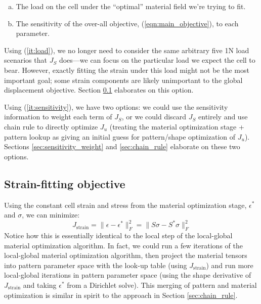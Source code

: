 \documentclass[10pt]{article}
\providecommand{\norm}[1]{\lVert#1\rVert}
\begin{document}
\begin{enumerate}[(a)]
    \item The load on the cell under the ``optimal'' material field we're trying to fit.
          \label{it:load}
    \item The sensitivity of the over-all objective, (\ref{eqn:main_objective}),
          to each parameter.
          \label{it:sensitivity}
\end{enumerate}

Using (\ref{it:load}), we no longer need to consider the same arbitrary five 1N
load scenarios that $J_S$ does---we can focus on the particular load we expect
the cell to bear. However, exactly fitting the strain under this load might not
be the most important goal; some strain components are likely unimportant to
the global displacement objective. Section \ref{sec:strain_fit} elaborates on this option.

Using (\ref{it:sensitivity}), we have two options: we could use the sensitivity
information to weight each term of $J_S$, or we could discard $J_S$ entirely
and use chain rule to directly optimize $J_u$ (treating
the material optimization stage + pattern lookup as giving an initial guess for
pattern/shape optimization of $J_u$). Sections \ref{sec:sensitivity_weight}
and \ref{sec:chain_rule} elaborate on these two options.

\subsection{Strain-fitting objective}
\label{sec:strain_fit}
Using the constant cell strain and stress from the material optimization stage,
$\epsilon^*$ and $\sigma$, we can minimize:
$$
J_\text{strain} = \norm{\epsilon - \epsilon^*}^2_F = \norm{S \sigma - S^* \sigma}_F^2
$$
Notice how this is essentially identical to the local step of the local-global
material optimization algorithm. In fact, we could run a few iterations of the
local-global material optimization algorithm, then project the material tensors into
pattern parameter space with the look-up table (using $J_\text{strain}$) and
run more local-global iterations in pattern parameter space  (using the shape
derivative of $J_\text{strain}$ and taking $\epsilon^*$ from a Dirichlet
solve). This merging of pattern and material optimization is similar in spirit to
the approach in Section \ref{sec:chain_rule}.
\end{document}
